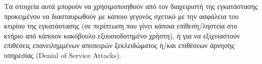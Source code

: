	Τα στοιχεία αυτά μπορούν να χρησιμοποιηθούν από τον διαχειριστή της εγκατάστασης προκειμένου να διασταυρωθούν με κάποιο γεγονός σχετικό με την ασφάλεια του κτιρίου της εγκατάστασης (σε περίπτωση που γίνει κάποια επίθεση/ληστεία στο κτήριο από κάποιον κακόβουλο εξουσιοδοτημένο χρήστη), ή για να εξιχνιαστούν επιθέσεις επανειλημμένων αποπειρών ξεκλειδώματος ή/και επιθέσεων άρνησης υπηρεσίας (Denial of Service Attacks).
